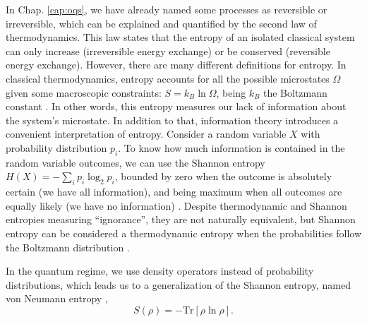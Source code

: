 In Chap. \ref{cap:oqs}, we have already named some processes as reversible or irreversible, which can be explained and quantified by the second law of thermodynamics. This law states that the entropy of an isolated classical system can only increase (irreversible energy exchange) or be conserved (reversible energy exchange). However, there are many different definitions for entropy. In classical thermodynamics, entropy accounts for all the possible microstates $\Omega$ given some macroscopic constraints: $S = k_B \ln \Omega$, being $k_B$ the Boltzmann constant \cite{callen-book}. In other words, this entropy measures our lack of information about the system's microstate. In addition to that, information theory introduces a convenient interpretation of entropy. Consider a random variable $X$ with probability distribution $p_i$. To know how much information is contained in the random variable outcomes, we can use the Shannon entropy $H(X) = - \sum_i p_i \log_2 p_i$, bounded by zero when the outcome is absolutely certain (we have all information), and being maximum when all outcomes are equally likely (we have no information) \cite{chuang-book}. Despite thermodynamic and Shannon entropies measuring ``ignorance'', they are not naturally equivalent, but Shannon entropy can be considered a thermodynamic entropy when the probabilities follow the Boltzmann distribution \cite{parrondo-2024, parrondo-2015}.

In the quantum regime, we use density operators instead of probability distributions, which leads us to a generalization of the Shannon entropy, named von Neumann entropy \cite{chuang-book},
\begin{equation}
    S({\rho}) = - \text{Tr}[{\rho} \ln {\rho}].
\end{equation}

